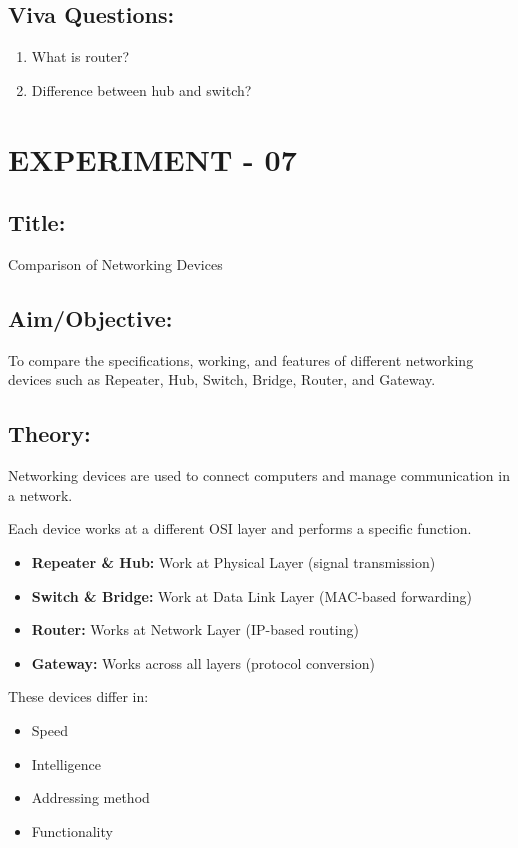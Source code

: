 \documentclass[a4paper,10pt]{article}
\begin{document}
\subsection{Viva Questions:}
\begin{enumerate}
    \item What is router?
    \item Difference between hub and switch?
\end{enumerate}

\newpage
\section{EXPERIMENT - 07}
\subsection{Title:}
Comparison of Networking Devices

\subsection{Aim/Objective:}
To compare the specifications, working, and features of different networking devices such as Repeater, Hub, Switch, Bridge, Router, and Gateway.

\subsection{Theory:}
Networking devices are used to connect computers and manage communication in a network.

Each device works at a different OSI layer and performs a specific function.
\begin{itemize}
    \item \textbf{Repeater \& Hub:} Work at Physical Layer (signal transmission)
    \item \textbf{Switch \& Bridge:} Work at Data Link Layer (MAC-based forwarding)
    \item \textbf{Router:} Works at Network Layer (IP-based routing)
    \item \textbf{Gateway:} Works across all layers (protocol conversion)
\end{itemize}

These devices differ in:
\begin{itemize}
    \item Speed
    \item Intelligence
    \item Addressing method
    \item Functionality
\end{itemize}
\end{document}

